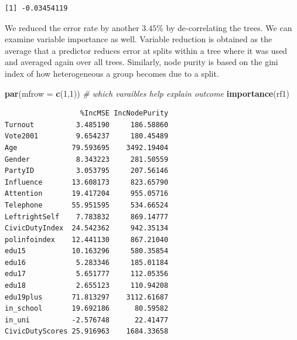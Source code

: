 \documentclass[]{article}
\newenvironment{Shaded}{\begin{snugshade}}{\end{snugshade}}
\newcommand{\CommentTok}[1]{\textcolor[rgb]{0.56,0.35,0.01}{\textit{#1}}}
\newcommand{\DataTypeTok}[1]{\textcolor[rgb]{0.13,0.29,0.53}{#1}}
\newcommand{\DecValTok}[1]{\textcolor[rgb]{0.00,0.00,0.81}{#1}}
\newcommand{\KeywordTok}[1]{\textcolor[rgb]{0.13,0.29,0.53}{\textbf{#1}}}
\newcommand{\NormalTok}[1]{#1}
\newcommand{\OperatorTok}[1]{\textcolor[rgb]{0.81,0.36,0.00}{\textbf{#1}}}
\newcommand{\OtherTok}[1]{\textcolor[rgb]{0.56,0.35,0.01}{#1}}
\newcommand{\StringTok}[1]{\textcolor[rgb]{0.31,0.60,0.02}{#1}}
\begin{document}
\begin{Shaded}
\end{Shaded}

\begin{verbatim}
[1] -0.03454119
\end{verbatim}

We reduced the error rate by another \(3.45\%\) by de-correlating the trees. We can examine variable importance as well. Variable reduction is obtained as the average that a predictor reduces error at splits within a tree where it was used and averaged again over all trees. Similarly, node purity is based on the gini index of how heterogeneous a group becomes due to a split.

\begin{Shaded}
\begin{Highlighting}[]
\KeywordTok{par}\NormalTok{(}\DataTypeTok{mfrow =} \KeywordTok{c}\NormalTok{(}\DecValTok{1}\NormalTok{,}\DecValTok{1}\NormalTok{))}
\CommentTok{# which varaibles help explain outcome}
\KeywordTok{importance}\NormalTok{(rf1)}
\end{Highlighting}
\end{Shaded}

\begin{verbatim}
                  %IncMSE IncNodePurity
Turnout          3.485190     186.58860
Vote2001         9.654237     180.45489
Age             79.593695    3492.19404
Gender           8.343223     281.50559
PartyID          3.053795     207.56146
Influence       13.608173     823.65790
Attention       19.417204     955.05716
Telephone       55.951595     534.66524
LeftrightSelf    7.783832     869.14777
CivicDutyIndex  24.542362     942.35134
polinfoindex    12.441130     867.21040
edu15           10.163296     580.35854
edu16            5.283346     185.01184
edu17            5.651777     112.05356
edu18            2.655123     110.94208
edu19plus       71.813297    3112.61687
in_school       19.692186      80.59582
in_uni          -2.576748      22.41477
CivicDutyScores 25.916963    1684.33658
\end{verbatim}
\end{document}
